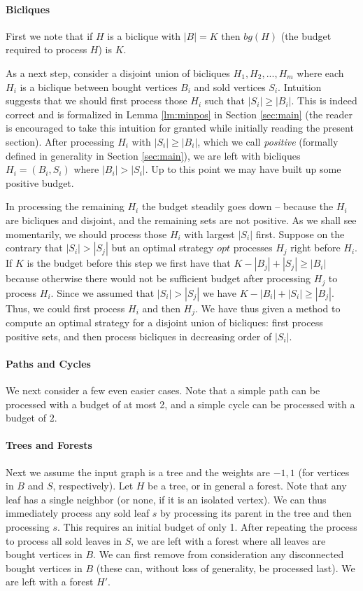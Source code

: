 \documentclass[letterpaper,11pt,abstracton]{scrartcl}
\begin{document}
\paragraph{\textbf{Bicliques}}
First we note that if $H$ is a biclique with $|B|=K$ then $bg(H)$ (the
budget required to process $H$) is $K$.

As a next step, consider a disjoint union of bicliques $H_1, H_2, ...,
H_m$ where each $H_i$ is a biclique between bought vertices $B_i$ and
sold vertices $S_i$.  Intuition suggests that we should first process
those $H_i$ such that $|S_i| \geq |B_i|$.  This is indeed correct and
is formalized in Lemma \ref{lm:minpos} in Section \ref{sec:main} (the
reader is encouraged to take this intuition for granted while
initially reading the present section).  After processing $H_i$ with
$|S_i|\geq|B_i|$, which we call \emph{positive} (formally defined in
generality in Section \ref{sec:main}), we are left with bicliques
$H_i=(B_i,S_i)$ where $|B_i|>|S_i|$. Up to this point we may have
built up some positive budget.

In processing the remaining $H_i$ the budget steadily goes down --
because the $H_i$ are bicliques and disjoint, and the remaining sets
are not positive.  As we shall see momentarily, we should process those $H_i$ with largest $|S_i|$
first. Suppose on the contrary that $|S_i|>|S_j|$ but an optimal
strategy $opt$ processes $H_j$ right before $H_i$.  If $K$ is the
budget before this step we first have that $K-|B_j|+|S_j| \ge |B_i|$
because otherwise there would not be sufficient budget after
processing $H_j$ to process $H_i$.  Since we assumed that $|S_i| >
|S_j|$ we have $K-|B_i|+|S_i| \ge |B_j|$. Thus, we could first process
$H_i$ and then $H_j$.  We have thus given a method to compute an
optimal strategy for a disjoint union of bicliques: first process
positive sets, and then process bicliques in decreasing order of
$|S_i|$.

\paragraph{\textbf{Paths and Cycles}}
We next consider a few even easier cases.  Note that a simple
path can be processed with a budget of at most 2, and a simple
cycle can be processed with a budget of $2$.

\paragraph{\textbf{Trees and Forests}}
Next we assume the input graph is a tree and the weights are $-1,1$
(for vertices in $B$ and $S$, respectively).  Let $H$ be a tree, or in
general a forest. Note that any leaf has a single neighbor (or none,
if it is an isolated vertex).  We can thus immediately process any
sold leaf $s$ by processing its parent in the tree and then processing
$s$.  This requires an initial budget of only 1.  After repeating the
process to process all sold leaves in $S$, we are left with a forest
where all leaves are bought vertices in $B$.  We can first remove from
consideration any disconnected bought vertices in $B$ (these can, without
loss of generality, be processed last).
We are left with a forest $H'$.
\end{document}
